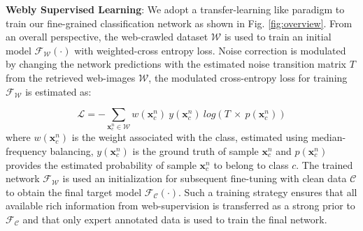 \documentclass{llncs}
\begin{document}
\noindent
\textbf{Webly Supervised Learning}: We adopt a transfer-learning like paradigm to train our fine-grained classification network as shown in Fig. \ref{fig:overview}. From an overall perspective, the web-crawled dataset $\mathcal{W}$ is used to train an initial model $\mathcal{F}_{\mathcal{W}}\left ( \cdot \right )$ with weighted-cross entropy loss. Noise correction is modulated by changing the network predictions with the estimated noise transition matrix $T$ from the retrieved web-images $\mathcal{W}$, the modulated cross-entropy loss for training $\mathcal{F}_{\mathcal{W}}$ is estimated as: 


\begin{equation}
\mathcal{L} = - \sum_{\mathbf{x}_{c}^{n} \in \mathcal{W}} w(\mathbf{x}_{c}^{n}) \ y(\mathbf{x}_{c}^{n}) \ log(T \ \times \ p(\mathbf{x}_{c}^{n}))
\label{eq:crossentropy}
\end{equation}
where $w(\mathbf{x}_{c}^{n})$ is the weight associated with the class, estimated using median-frequency balancing, $y(\mathbf{x}_{c}^{n})$ is the ground truth of sample $\mathbf{x}_{c}^{n}$ and $p(\mathbf{x}_{c}^{n})$ provides the estimated probability of sample  $\mathbf{x}_{c}^{n}$ to belong to class $c$. The trained network $\mathcal{F}_{\mathcal{W}}$ is used an initialization for subsequent fine-tuning with clean data $\mathcal{C}$ to obtain the final target model $\mathcal{F}_{\mathcal{C}}\left ( \cdot \right )$. Such a training strategy ensures that all available rich information from web-supervision is transferred as a strong prior to $\mathcal{F}_{\mathcal{C}}$ and that only expert annotated data is used to train the final network. 


\end{document}
